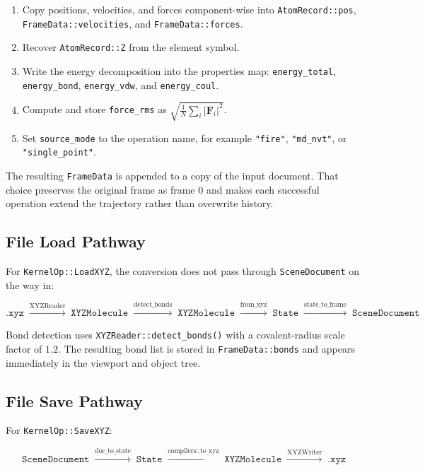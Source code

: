﻿\documentclass[11pt]{article}
\newcommand{\type}[1]{\texttt{#1}}
\newcommand{\field}[1]{\texttt{#1}}
\newcommand{\op}[1]{\texttt{#1}}
\begin{document}
\begin{enumerate}
  \item Copy positions, velocities, and forces component-wise into
        \field{AtomRecord::pos}, \field{FrameData::velocities}, and
        \field{FrameData::forces}.
  \item Recover \field{AtomRecord::Z} from the element symbol.
  \item Write the energy decomposition into the properties map:
        \texttt{energy\_total}, \texttt{energy\_bond},
        \texttt{energy\_vdw}, and \texttt{energy\_coul}.
  \item Compute and store \texttt{force\_rms} as
        $\sqrt{\frac{1}{N}\sum_i |\mathbf{F}_i|^2}$.
  \item Set \field{source\_mode} to the operation name, for example
        \texttt{"fire"}, \texttt{"md\_nvt"}, or
        \texttt{"single\_point"}.
\end{enumerate}

The resulting \type{FrameData} is appended to a copy of the input document.
That choice preserves the original frame as frame 0 and makes each successful
operation extend the trajectory rather than overwrite history.

\subsection{File Load Pathway}

For \op{KernelOp::LoadXYZ}, the conversion does not pass through
\type{SceneDocument} on the way in:

\[
  \texttt{.xyz} \;\xrightarrow{\text{XYZReader}}\;
  \texttt{XYZMolecule} \;\xrightarrow{\text{detect\_bonds}}\;
  \texttt{XYZMolecule} \;\xrightarrow{\text{from\_xyz}}\;
  \texttt{State} \;\xrightarrow{\text{state\_to\_frame}}\;
  \texttt{SceneDocument}
\]

Bond detection uses \op{XYZReader::detect\_bonds()} with a covalent-radius
scale factor of $1.2$. The resulting bond list is stored in
\field{FrameData::bonds} and appears immediately in the viewport and object
tree.

\subsection{File Save Pathway}

For \op{KernelOp::SaveXYZ}:

\[
  \texttt{SceneDocument} \;\xrightarrow{\text{doc\_to\_state}}\;
  \texttt{State} \;\xrightarrow{\text{compilers::to\_xyz}}\;
  \texttt{XYZMolecule} \;\xrightarrow{\text{XYZWriter}}\;
  \texttt{.xyz}
\]
\end{document}
